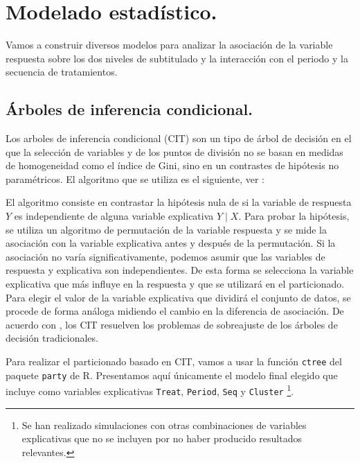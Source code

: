 \documentclass[
  12pt,
  a4paper,
  extrafontsizes,
  onecolumn,
  openright]{memoir}
\begin{document}

\hypertarget{modelado-estaduxedstico.}{%
\chapter{Modelado estadístico.}\label{modelado-estaduxedstico.}}

Vamos a construir diversos modelos para analizar la asociación de la
variable respuesta sobre los dos niveles de subtitulado y la interacción
con el periodo y la secuencia de tratamientos.

\hypertarget{uxe1rboles-de-inferencia-condicional.}{%
\section{Árboles de inferencia
condicional.}\label{uxe1rboles-de-inferencia-condicional.}}

Los arboles de inferencia condicional (CIT) son un tipo de árbol de
decisión en el que la selección de variables y de los puntos de división
no se basan en medidas de homogeneidad como el índice de Gini, sino en
un contrastes de hipótesis no paramétricos. El algoritmo que se utiliza
es el siguiente, ver \textcite{Levshina2020}:

El algoritmo consiste en contrastar la hipótesis nula de si la variable
de respuesta \(Y\) es independiente de alguna variable explicativa
\(Y \mid X\). Para probar la hipótesis, se utiliza un algoritmo de
permutación de la variable respuesta y se mide la asociación con la
variable explicativa antes y después de la permutación. Si la asociación
no varía significativamente, podemos asumir que las variables de
respuesta y explicativa son independientes. De esta forma se selecciona
la variable explicativa que más influye en la respuesta y que se
utilizará en el particionado. Para elegir el valor de la variable
explicativa que dividirá el conjunto de datos, se procede de forma
análoga midiendo el cambio en la diferencia de asociación. De acuerdo
con \textcite{frienly2015-2}, los CIT resuelven los problemas de
sobreajuste de los árboles de decisión tradicionales.

Para realizar el particionado basado en CIT, vamos a usar la función
\texttt{ctree} del paquete \texttt{party} de R. Presentamos aquí
únicamente el modelo final elegido que incluye como variables
explicativas \texttt{Treat}, \texttt{Period}, \texttt{Seq} y
\texttt{Cluster} \footnote{Se han realizado simulaciones con otras
  combinaciones de variables explicativas que no se incluyen por no
  haber producido resultados relevantes.}.
\end{document}
